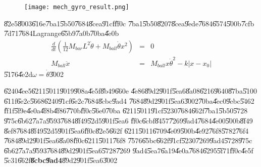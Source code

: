 \begin{center}
\begin{figure}[th]
\caption{{}}
\begin{center}
\texttt{[image: mech\_gyro\_result.png]}
\end{center}
\end{figure}
\end{center}

\U{82e5}\U{8003}\U{616e}\U{7ba1}\U{5b50}\U{7684}\U{8cea}\U{91cf}\U{ff0c}%
\U{7ba1}\U{5b50}\U{8207}\U{8cea}\U{9ede}\U{7684}\U{6574}\U{500b}\U{7cfb}%
\U{7d71}\U{7684}Lagrange\U{65b9}\U{7a0b}\U{70ba}\U{4e0b}%
\begin{eqnarray*}
\frac{d}{dt}\left( \frac{1}{12}M_{bar}L^{2}\dot{\theta}+M_{ball}\dot{\theta}%
x^{2}\right) &=&0 \\
M_{ball}\ddot{x} &=&M_{ball}x\dot{\theta}^{2}-k\left\vert x-x_{0}\right\vert
\end{eqnarray*}%
\U{5176}\U{4e2d}$\omega =\dot{\theta}$\U{3002}

\bigskip

\U{6240}\U{4ee5}\U{6211}\U{5011}\U{9019}\U{908a}\U{4e5f}\U{8b49}\U{660e}%
\U{4e86}\U{89d2}\U{901f}\U{5ea6}\U{8a08}\U{6216}\U{9640}\U{87ba}\U{5100}%
\U{611f}\U{6e2c}\U{5668}\U{6240}\U{91cf}\U{6e2c}\U{7684}\U{8cbc}\U{9ad4}%
\U{7684}\U{89d2}\U{901f}\U{5ea6}\U{3002}\U{70ba}\U{4ec0}\U{9ebc}\U{5462}%
\U{ff1f}\U{5f9e}\U{4e0a}\U{4f8b}\U{4f86}\U{770b}\U{ff0c}\U{56e0}\U{70ba}%
\U{6211}\U{5011}\U{91cf}\U{5230}\U{7684}\U{662f}\U{7ba1}\U{5b50}\U{5728}%
\U{975c}\U{6b62}\U{7a7a}\U{9593}\U{7684}\U{8f49}\U{52d5}\U{901f}\U{5ea6}%
\U{ff0c}\U{6cbf}\U{8457}\U{7269}\U{9ad4}\U{7684}\U{4e00}\U{500b}\U{8f49}%
\U{8ef8}\U{7684}\U{8f49}\U{52d5}\U{901f}\U{5ea6}\U{ff0c}\U{82e5}\U{662f}%
\U{6211}\U{5011}\U{6709}\U{4e09}\U{500b}\U{4e92}\U{76f8}\U{5782}\U{76f4}%
\U{7684}\U{89d2}\U{901f}\U{5ea6}\U{8a08}\U{ff0c}\U{6211}\U{5011}\U{76f8}%
\U{7576}\U{65bc}\U{662f}\U{91cf}\U{5230}\U{7269}\U{9ad4}\U{5728}\U{975c}%
\U{6b62}\U{7a7a}\U{9593}\U{7684}\U{89d2}\U{901f}\U{5ea6}\U{5728}\U{7269}%
\U{9ad4}\U{5ea7}\U{6a19}\U{4e0a}\U{7684}\U{6295}\U{5f71}\U{ff0c}\U{4e5f}%
\U{5c31}\U{662f}\textbf{\U{8cbc}\U{9ad4}}\U{89d2}\U{901f}\U{5ea6}\U{3002}%
\bigskip

